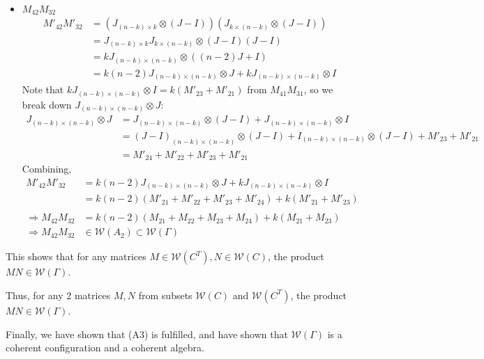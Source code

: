 \documentclass{article}
\begin{document}
\begin{itemize}
\begin{itemize}
\begin{itemize}
            \item $M_{42}M_{32}$
            \begin{align*}
                M'_{42}M'_{32}
                &= (J_{(n-k)\times k}\otimes (J-I))(J_{k\times (n-k)}\otimes (J-I)) \\
                &= J_{(n-k)\times k}J_{k\times (n-k)} \otimes (J-I)(J-I) \\
                &= kJ_{(n-k)\times (n-k)}\otimes ((n-2)J+I) \\
                &= k(n-2)J_{(n-k)\times (n-k)}\otimes J + kJ_{(n-k)\times (n-k)}\otimes I
            \end{align*}
            Note that $kJ_{(n-k)\times (n-k)}\otimes I = k(M'_{23} + M'_{21})$ from $M_{41}M_{31}$, so we break down $J_{(n-k)\times (n-k)}\otimes J$:
            \begin{align*}
                J_{(n-k)\times (n-k)}\otimes J
                &= J_{(n-k)\times (n-k)}\otimes (J-I) + J_{(n-k)\times (n-k)}\otimes I \\
                &= (J-I)_{(n-k)\times (n-k)}\otimes (J-I) + I_{(n-k)\times (n-k)}\otimes (J-I) + M'_{23} + M'_{21} \\
                &= M'_{24}+M'_{22}+M'_{23} + M'_{21}
            \end{align*}
            Combining,
            \begin{align*}
                M'_{42}M'_{32}
                &= k(n-2)J_{(n-k)\times (n-k)}\otimes J + kJ_{(n-k)\times (n-k)}\otimes I \\
                &= k(n-2)(M'_{21}+M'_{22}+M'_{23} + M'_{24}) + k(M'_{21} + M'_{23}) \\\\
                \Rightarrow M_{42}M_{32} &= k(n-2)(M_{21}+M_{22}+M_{23} + M_{24}) + k(M_{21} + M_{23}) \\
                \Rightarrow M_{42}M_{32} &\in\mathcal{W}(A_2)\subset\mathcal{W}(\Gamma)
            \end{align*}
        \end{itemize}
        This shows that for any matrices $M\in\mathcal{W}(C^T),N \in \mathcal{W}(C)$, the product $MN \in\mathcal{W}(\Gamma)$.
    \end{itemize}
    Thus, for any 2 matrices $M,N$ from subsets $\mathcal{W}(C)$ and $\mathcal{W}(C^T)$, the product $MN \in \mathcal{W}(\Gamma)$.
\end{itemize}
Finally, we have shown that (A3) is fulfilled, and have shown that $\mathcal{W}(\Gamma)$ is a coherent configuration and a coherent algebra.
\end{document}
